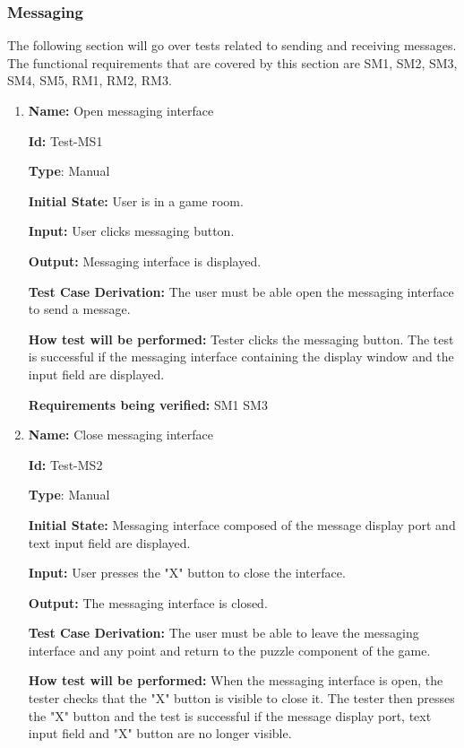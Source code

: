 \documentclass[12pt, titlepage]{article}
\begin{document}
\subsubsection{Messaging}
The following section will go over tests related to sending and receiving messages. The functional requirements that are covered by this section are SM1, SM2, SM3, SM4, SM5, RM1, RM2, RM3.

\begin{enumerate}

\item{\textbf{Name:} Open messaging interface} \label{itm:Test-MS1}

\textbf{Id:} Test-MS1

\textbf{Type}: Manual

\textbf{Initial State:} User is in a game room.

\textbf{Input:} User clicks messaging button.

\textbf{Output:} Messaging interface is displayed.

\textbf{Test Case Derivation:}
The user must be able open the messaging interface to send a message.

\textbf{How test will be performed:}
Tester clicks the messaging button. The test is successful if the messaging interface containing the display window and the input field are displayed.

\textbf{Requirements being verified: } SM1 SM3

\item{\textbf{Name:} Close messaging interface} \label{itm:Test-MS2}

\textbf{Id:} Test-MS2

\textbf{Type}: Manual

\textbf{Initial State:} Messaging interface composed of the message display port and text input field are displayed.

\textbf{Input:} User presses the "X" button to close the interface.

\textbf{Output:} The messaging interface is closed.

\textbf{Test Case Derivation:}
The user must be able to leave the messaging interface and any point and return to the puzzle component of the game.

\textbf{How test will be performed:}
When the messaging interface is open, the tester checks that the "X" button is visible to close it. The tester then presses the "X" button and the test is successful if the message display port, text input field and "X" button are no longer visible.


\end{enumerate}
\end{document}

